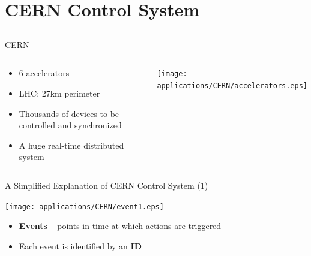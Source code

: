 \documentclass[compress,red]{beamer}
\begin{document}
\section{CERN Control System}
\subsection{}
\begin{frame}{CERN}

\begin{columns}[c]
    \begin{center}

      \begin{itemize}
	\item 6 accelerators
	\item LHC: 27km perimeter
	\item Thousands of devices to be controlled and synchronized
	\item A huge real-time distributed system
      \end{itemize}

    \end{center}
    \begin{center}
      \texttt{[image: applications/CERN/accelerators.eps]}
    \end{center}
\end{columns}

\end{frame}
\begin{frame}{A Simplified Explanation of CERN Control System (1)}

      \begin{center}
      \texttt{[image: applications/CERN/event1.eps]}
      \end{center}

  \begin{itemize}
    \item {\bf Events} -- points in time at which actions are triggered
    \item Each event is identified by an {\bf ID}
  \end{itemize}

\end{frame}
\end{document}
